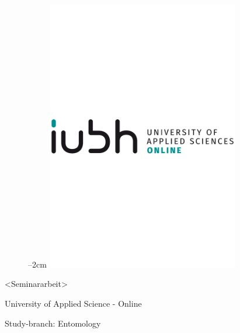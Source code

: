 
\label{titlePage}
\begin{figure}[h]
\centering
\advance\leftskip--2cm
\includegraphics[width=0.75\textwidth]{pics/logo.pdf}
\end{figure}
\FloatBarrier

\begin{Large} 
\begin{center}
<Seminararbeit>
\end{center}
\end{Large} 

\vspace*{5mm}

\begin{large} 
\begin{center}
University of Applied Science - Online
\end{center}
\end{large} 

\begin{large} 
\begin{center}
Study-branch: Entomology
\end{center}
\end{large}

